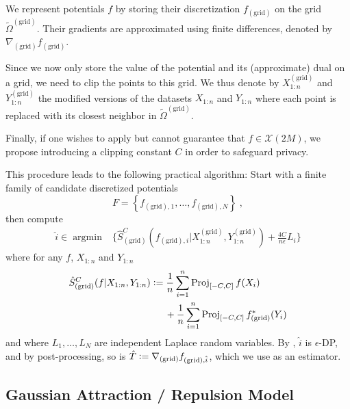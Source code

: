 \documentclass{article}
\theoremstyle{plain}
\theoremstyle{definition}
\theoremstyle{remark}
\newcommand{\argmin}[0]{\operatorname{argmin}}
\newcommand{\eqdef}{\vcentcolon=}
\newcommand\proj[0]{\operatorname{Proj}}
\begin{document}
We represent potentials $f$ by storing their discretization $f_{(\text{grid})}$ on the grid $\tilde{\Omega}^{(\text{grid})}$. Their gradients are approximated using finite differences, denoted by $\nabla_{(\text{grid})} f_{(\text{grid})}$.

Since we now only store the value of the potential and its (approximate) dual on a grid, we need to clip the points to this grid. We thus denote by $X_{1:n}^{(\text{grid})}$ and $Y_{1:n}^{(\text{grid})}$ the modified versions of the datasets $X_{1:n}$ and $Y_{1:n}$ where each point is replaced with its closest neighbor in $\tilde{\Omega}^{(\text{grid})}$.

Finally, if one wishes to apply  but cannot guarantee that $f \in \mathcal{X}(2M)$, we propose introducing a clipping constant $C$ in order to safeguard privacy. 

This procedure leads to the following practical algorithm: Start with a finite family of candidate discretized potentials
\begin{equation}
    F = \left\{ f_{(\text{grid}), 1}, \dots, f_{(\text{grid}), N} \right\} \;,
\end{equation}
then compute
\begin{equation}
\label{eq:juihgfkjhqgsjkdf}
\begin{aligned}
\hat{i} \in \argmin &\bigg\{\hat{S}_{(\text{grid})}^C(f_{(\text{grid}), i} | X_{1:n}^{(\text{grid})}, Y_{1:n}^{(\text{grid})})  + \frac{4 C}{n \epsilon} L_i \bigg\}
\end{aligned}
\end{equation}
where for any $f$, $X_{1:n}$ and $Y_{1:n}$
\begin{equation}
\begin{aligned}
    &\hat{S}_{(\text{grid})}^C(f | X_{1:n}, Y_{1:n})  \eqdef \frac{1}{n} \sum_{i = 1}^n \proj_{[-C, C]} f(X_i)  \\ 
    &\qquad\qquad\qquad\qquad\qquad+ \frac{1}{n} \sum_{i = 1}^n  \proj_{[-C, C]}f^*_{(\text{grid})}(Y_i)
\end{aligned}
\end{equation}
and where $L_1, \dots, L_N$ are independent Laplace random variables.
By , $\hat{i}$ is $\epsilon$-DP, and by post-processing, so is $\hat{T} \eqdef \nabla_{(\text{grid})} f_{(\text{grid}), \hat{i}}$, which we use as an estimator.

\subsection{Gaussian Attraction / Repulsion Model}
\label{sec:gaussian_attraction_repulsion_model}
\end{document}
